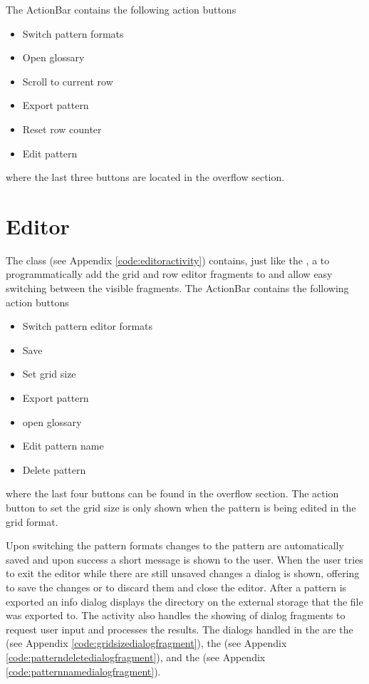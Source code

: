 The ActionBar contains the following action buttons

\begin{itemize}
\item Switch pattern formats
\item Open glossary
\item Scroll to current row
\item Export pattern
\item Reset row counter
\item Edit pattern
\end{itemize}

where the last three buttons are located in the overflow section.

\section{Editor}
The class  (see Appendix \ref{code:editoractivity}) contains, just like the , a  to programmatically add the grid and row editor fragments to and allow easy switching between the visible fragments. The ActionBar contains the following action buttons 

\begin{itemize}
\item Switch pattern editor formats
\item Save
\item Set grid size
\item Export pattern
\item open glossary
\item Edit pattern name
\item Delete pattern
\end{itemize}

where the last four buttons can be found in the overflow section. The action button to set the grid size is only shown when the pattern is being edited in the grid format.

Upon switching the pattern formats changes to the pattern are automatically saved and upon success a short message is shown to the user. When the user tries to exit the editor while there are still unsaved changes a dialog is shown, offering to save the changes or to discard them and close the editor. After a pattern is exported an info dialog displays the directory on the external storage that the file was exported to.
The activity also handles the showing of dialog fragments to request user input and processes the results. The dialogs handled in the  are the  (see Appendix \ref{code:gridsizedialogfragment}), the  (see Appendix \ref{code:patterndeletedialogfragment}), and the  (see Appendix \ref{code:patternnamedialogfragment}).

